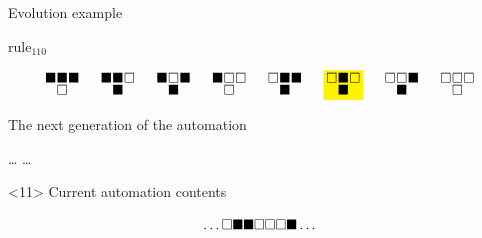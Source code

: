 \documentclass[presentation,aspectratio=169,smaller]{beamer}
\begin{document}
\begin{frame}[label={sec:org3545853},t]{Evolution example}
\begin{onlyenv}
\(\text{rule}_{110}\)

\begin{equation*}
  \begingroup
  \setlength\arraycolsep{0.25pt}
  \renewcommand{\arraystretch}{0.5}
  \begin{matrix}
    \blacksquare & \blacksquare & \blacksquare \\
    & \square &
  \end{matrix}\mspace{28mu}
  \begin{matrix}
    \blacksquare & \blacksquare & \square \\
    & \blacksquare &
  \end{matrix}\mspace{28mu}
  \begin{matrix}
    \blacksquare & \square & \blacksquare \\
    & \blacksquare &
  \end{matrix}\mspace{28mu}
  \begin{matrix}
    \blacksquare & \square & \square \\
    & \square &
  \end{matrix}\mspace{28mu}
  \begin{matrix}
    \square & \blacksquare & \blacksquare \\
    & \blacksquare &
  \end{matrix}\mspace{28mu}
  \mathcolorbox{yellow}{
    \begin{matrix}
      \square & \blacksquare & \square \\
      & \blacksquare &
    \end{matrix}
  }\mspace{28mu}
  \begin{matrix}
    \square & \square & \blacksquare \\
    & \blacksquare &
  \end{matrix}\mspace{28mu}
  \begin{matrix}
    \square & \square & \square \\
    & \square &
  \end{matrix}
  \endgroup
\end{equation*}

The next generation of the automation

\hfill \dots
\blacksquare
\blacksquare
\blacksquare
\square
\square
\square
{}
\dots \hfill
\end{onlyenv}

\begin{onlyenv}<11>
Current automation contents

\begin{equation*}
  \hfill
  \dots
  \square
  \blacksquare
  \blacksquare
  \square
  \square
  \square
  \blacksquare
  \dots
  \hfill
\end{equation*}


\end{onlyenv}
\end{frame}
\end{document}
